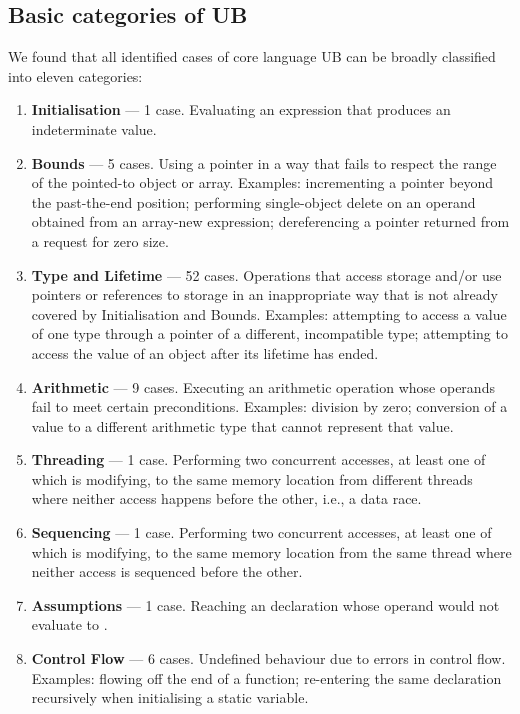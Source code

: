 \subsection{Basic categories of UB}
\label{categories}

We found that all identified cases of core language UB can be broadly classified into eleven categories:
 \renewcommand{\labelenumi}{\Roman{enumi}.}
\begin{enumerate}
\item \textbf{Initialisation} --- 1 case. Evaluating an expression that produces an indeterminate value.
\item \textbf{Bounds} --- 5 cases. Using a pointer in a way that fails to respect the range of the pointed-to object or array. Examples: incrementing a pointer beyond the past-the-end position; performing single-object delete on an operand obtained from an array-new expression;  dereferencing a pointer returned from a request for zero size.
\item \textbf{Type and Lifetime} --- 52 cases. Operations that access storage and/or use pointers or references to storage in an inappropriate way that is not already covered by Initialisation and Bounds. Examples: attempting to access a value of one type through  a pointer of a different, incompatible type; attempting to access the value of an object after its lifetime has ended. 
\item \textbf{Arithmetic} --- 9 cases. Executing an arithmetic operation whose operands fail to meet certain preconditions. Examples: division by zero; conversion of a value to a different arithmetic type that cannot represent that value. 
\item \textbf{Threading} --- 1 case. Performing two concurrent accesses, at least one of which is modifying, to the same memory location from different threads where neither access happens before the other, i.e., a data race.
\item \textbf{Sequencing} --- 1 case. Performing two concurrent accesses, at least one of which is modifying, to the same memory location from the same thread where neither access is sequenced before the other.
\item \textbf{Assumptions} --- 1 case. Reaching an \tcode{[[assume]]} declaration whose operand would not evaluate to .
\item \textbf{Control Flow} --- 6 cases. Undefined behaviour due to errors in control flow. Examples: flowing off the end of a function; re-entering the same declaration recursively when initialising a static variable.

\end{enumerate}
